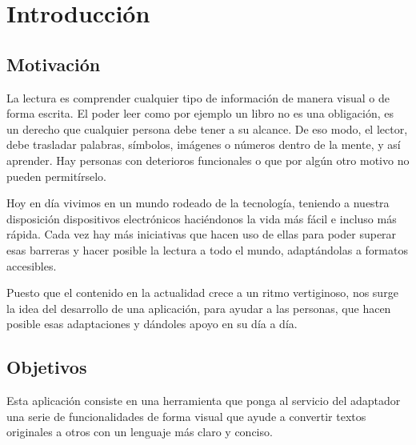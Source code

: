 \chapter{Introducción}
\label{cap:introduccion}


\section{Motivación}

La lectura es comprender cualquier tipo de información de manera visual o de forma escrita. El poder leer como por ejemplo un libro no es una obligación, es un derecho que cualquier persona debe tener a su alcance. De eso modo, el lector, debe trasladar palabras, símbolos, imágenes o números dentro de la mente, y así aprender. Hay personas con deterioros funcionales o que por algún otro motivo no pueden permitírselo. 

Hoy en día vivimos en un mundo rodeado de la tecnología, teniendo a nuestra disposición dispositivos electrónicos haciéndonos la vida más fácil e incluso más rápida. Cada vez hay más iniciativas que hacen uso de ellas para poder superar esas barreras y hacer posible la lectura a todo el mundo, adaptándolas a formatos accesibles. 

Puesto que el contenido en la actualidad crece a un ritmo vertiginoso, nos surge la idea del desarrollo de una aplicación, para ayudar a las personas, que hacen posible esas adaptaciones y dándoles apoyo en su día a día.


\section{Objetivos}
Esta aplicación consiste en una herramienta que ponga al servicio del adaptador una serie de funcionalidades de forma visual que ayude a convertir textos originales a otros con un lenguaje más claro y conciso.


